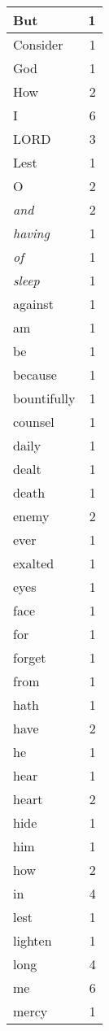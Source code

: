 \begin{center}
\begin{longtable}{l|r}
\hline \hline
\endlastfoot
But & 1 \\ \hline
Consider & 1 \\ \hline
God & 1 \\ \hline
How & 2 \\ \hline
I & 6 \\ \hline
LORD & 3 \\ \hline
Lest & 1 \\ \hline
O & 2 \\ \hline
\emph{and} & 2 \\ \hline
\emph{having} & 1 \\ \hline
\emph{of} & 1 \\ \hline
\emph{sleep} & 1 \\ \hline
against & 1 \\ \hline
am & 1 \\ \hline
be & 1 \\ \hline
because & 1 \\ \hline
bountifully & 1 \\ \hline
counsel & 1 \\ \hline
daily & 1 \\ \hline
dealt & 1 \\ \hline
death & 1 \\ \hline
enemy & 2 \\ \hline
ever & 1 \\ \hline
exalted & 1 \\ \hline
eyes & 1 \\ \hline
face & 1 \\ \hline
for & 1 \\ \hline
forget & 1 \\ \hline
from & 1 \\ \hline
hath & 1 \\ \hline
have & 2 \\ \hline
he & 1 \\ \hline
hear & 1 \\ \hline
heart & 2 \\ \hline
hide & 1 \\ \hline
him & 1 \\ \hline
how & 2 \\ \hline
in & 4 \\ \hline
lest & 1 \\ \hline
lighten & 1 \\ \hline
long & 4 \\ \hline
me & 6 \\ \hline
mercy & 1 \\ \hline

\end{longtable}
\end{center}
